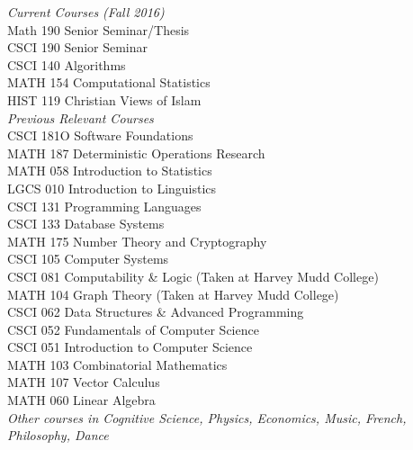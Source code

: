 {\sl Current Courses (Fall 2016)} \\
Math 190 Senior Seminar/Thesis \\
CSCI 190 Senior Seminar \\
CSCI 140 Algorithms \\
MATH 154 Computational Statistics \\
HIST 119 Christian Views of Islam \\

{\sl Previous Relevant Courses} \\
CSCI 181O Software Foundations \\
MATH 187 Deterministic Operations Research \\
MATH 058 Introduction to Statistics \\
LGCS 010 Introduction to Linguistics \\
CSCI 131 Programming Languages \\
CSCI 133 Database Systems \\
MATH 175 Number Theory and Cryptography \\
CSCI 105 Computer Systems\\
CSCI 081 Computability \& Logic (Taken at Harvey Mudd College)\\
MATH 104 Graph Theory (Taken at Harvey Mudd College)\\
CSCI 062 Data Structures \& Advanced Programming \\
CSCI 052 Fundamentals of Computer Science \\
CSCI 051 Introduction to Computer Science \\
MATH 103 Combinatorial Mathematics \\
MATH 107 Vector Calculus \\
MATH 060 Linear Algebra  \\
\textit{Other courses in Cognitive Science, Physics, Economics, Music, French, Philosophy, Dance}
